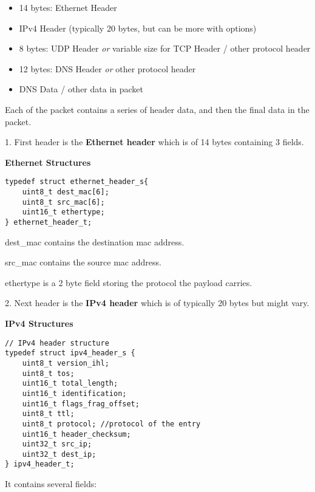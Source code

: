\documentclass[12pt, a4paper]{report}
\begin{document}
    \begin{itemize}
        \item 14 bytes: Ethernet Header
        \item IPv4 Header (typically 20 bytes, but can be more with options)
        \item 8 bytes: UDP Header \textit{or} variable size for TCP Header / other protocol header
        \item 12 bytes: DNS Header \textit{or} other protocol header
        \item DNS Data / other data in packet
    \end{itemize}


Each of the packet contains a series of header data, and then the final data in the packet.

1. First header is the \textbf{Ethernet header} which is of 14 bytes containing 3 fields.

\textbf{Ethernet Structures}

\begin{lstlisting}[caption={Ethernet Header Structure}]
typedef struct ethernet_header_s{
    uint8_t dest_mac[6];
    uint8_t src_mac[6];
    uint16_t ethertype;
} ethernet_header_t;
\end{lstlisting}

dest\_mac contains the destination mac address.

src\_mac contains the source mac address.

ethertype is a 2 byte field storing the protocol the payload carries.

2. Next header is the \textbf{IPv4 header} which is of typically 20 bytes but might vary.

\textbf{IPv4 Structures}

\begin{lstlisting}[caption={IPv4 Header Structure}]
// IPv4 header structure
typedef struct ipv4_header_s {
    uint8_t version_ihl;
    uint8_t tos;
    uint16_t total_length;
    uint16_t identification;
    uint16_t flags_frag_offset;
    uint8_t ttl;
    uint8_t protocol; //protocol of the entry
    uint16_t header_checksum;
    uint32_t src_ip;
    uint32_t dest_ip;
} ipv4_header_t;
\end{lstlisting}

It contains several fields:
\end{document}

